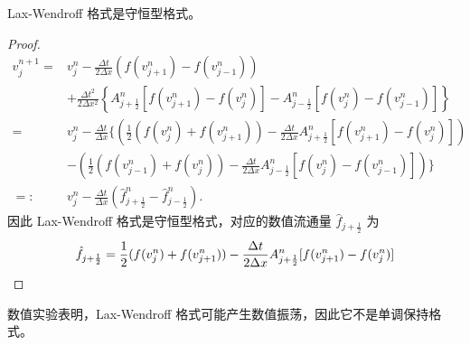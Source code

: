 \begin{example}
    Lax-Wendroff 格式是守恒型格式。
\end{example}

\begin{proof}
    \begin{align*}
        v_j^{n+1} ={} & v_j^n
        - \frac{\Delta t}{2\Delta x} \left(f(v_{j+1}^n)-f(v_{j-1}^n)\right)
        \\ & + \frac{\Delta t^2}{2\Delta x^2}\left\{
        A_{j+\frac12}^n [f(v_{j+1}^n) - f(v_{j}^n)]
        - A_{j-\frac12}^n [f(v_{j}^n) - f(v_{j-1}^n)]
        \right\}
        \\
        ={}           & v_j^n - \frac{\Delta t}{\Delta x}
        \Big\{
        \left(\frac12(f(v_j^n)+f(v_{j+1}^n)) - \frac{\Delta t}{2\Delta x} A_{j+\frac12}^n[f(v_{j+1}^n) - f(v_{j}^n)]\right)
        \\ & -
        \left(\frac12(f(v_{j-1}^n)+f(v_{j}^n)) - \frac{\Delta t}{2\Delta x} A_{j-\frac12}^n[f(v_{j}^n) - f(v_{j-1}^n)]\right)
        \Big\}                                                  \\
        =:{}          & v_j^n - \frac{\Delta t}{\Delta x}\left(
        \hat{f}_{j+\frac12}^n - \hat{f}_{j-\frac12}^n
        \right).
    \end{align*}
    因此 Lax-Wendroff 格式是守恒型格式，对应的数值流通量 $\hat{f}_{j+\frac12}$ 为
    \[
        \hat{f}_{j+\frac12} = \frac12(f(v_j^n)+f(v_{j+1}^n)) - \frac{\Delta t}{2\Delta x} A_{j+\frac12}^n[f(v_{j+1}^n) - f(v_{j}^n)] \qedhere
    \]
\end{proof}

\begin{remark}
    数值实验表明，Lax-Wendroff 格式可能产生数值振荡，因此它不是单调保持格式。
\end{remark}
